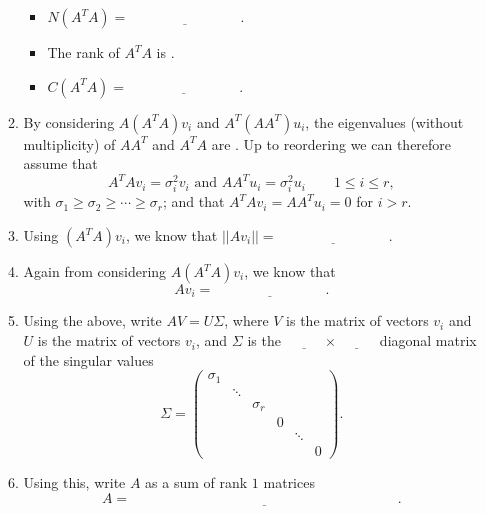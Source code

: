 \documentclass[11pt]{article}
\begin{document}
\begin{enumerate}
\begin{enumerate}
\begin{itemize}
\item $N(A^TA) =  \underline{\phantom{aaaaaaaaaaaaaaa}}$.
\item The rank of $A^TA$ is \underline{\phantom{aaaaaaaaaaaaaaa}}.
\item $C(A^TA) = \underline{\phantom{aaaaaaaaaaaaaaa}}$.
\end{itemize}
\item By considering $A(A^TA)v_i$ and $A^T(AA^T) u_i$, the eigenvalues (without multiplicity) of $AA^T$ and $A^TA$ are \underline{\phantom{aaaaaaaaaaaaaaaaaaaa}}.  Up to reordering we can therefore assume that 
\[A^TA v_i = \sigma_i^2 v_i \text{ and } AA^T u_i = \sigma_i^2 u_i \qquad 1 \leq i \leq r, \]
with $\sigma_1 \geq \sigma_2 \geq \cdots \geq \sigma_r$;
and that $A^TAv_i = AA^Tu_i = 0$ for $i > r$.

\item Using $(A^TA) v_i$, we know that $|| Av_i || = \underline{\phantom{aaaaaaaaaaaaaaa}}$.


\item Again from considering $A(A^TA)v_i$, we know that 
\[A v_i = \underline{\phantom{aaaaaaaaaaaaaaa}}. \]

\item Using the above, write $AV = U \Sigma$, where $V$ is the matrix of vectors $v_i$ and $U$ is the matrix of vectors $v_i$, and $\Sigma$ is the $\underline{\phantom{aaaaa}} \times \underline{\phantom{aaaaa}}$ diagonal matrix of the singular values
\[\Sigma = \begin{pmatrix} \sigma_1 &&&&&\\ & \ddots &&&& \\ && \sigma_r&&& \\ &&& 0&&\\ &&&& \ddots & \\ &&&&& 0 \end{pmatrix}. \]

\item Using this, write $A$ as a sum of \underline{\phantom{aaaaaaaaaaaaa}} rank $1$ matrices
\[A = \underline{\phantom{aaaaaaaaaaaaaaaaaaaaaaaaaaaaaaaaaaaa}}. \]


\end{enumerate}



\end{enumerate}
\end{document}

